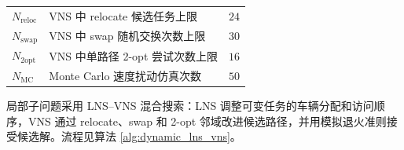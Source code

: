 \documentclass[withoutpreface,bwprint]{cumcmthesis} %
\begin{document}
\begin{table}[!htbp]
\begin{tabular}{
>{\centering\arraybackslash}p{2.2cm}
>{\raggedright\arraybackslash}p{9.0cm}
>{\centering\arraybackslash}p{3.0cm}}
$N_{\mathrm{reloc}}$ 
& VNS 中 relocate 候选任务上限 
& $24$ \\

\rowcolor{tablerow}
$N_{\mathrm{swap}}$ 
& VNS 中 swap 随机交换次数上限 
& $30$ \\

$N_{\mathrm{2opt}}$ 
& VNS 中单路径 2-opt 尝试次数上限 
& $16$ \\

\rowcolor{tablerow}
$N_{\mathrm{MC}}$ 
& Monte Carlo 速度扰动仿真次数 
& $50$ \\

\bottomrule
\end{tabular}

\end{table}

局部子问题采用 LNS--VNS 混合搜索：LNS 调整可变任务的车辆分配和访问顺序，VNS 通过 relocate、swap 和 2-opt 邻域改进候选路径\cite{mladenovic1997}，并用模拟退火准则接受候选解\cite{kirkpatrick1983}。流程见算法 \ref{alg:dynamic_lns_vns}。
\end{document}
